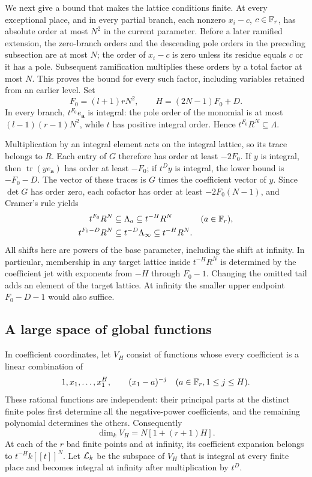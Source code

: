 We next give a bound that makes the lattice conditions finite.
At every exceptional place, and in every partial branch, each nonzero
$x_i-c$, $c\in\mathbb F_r$, has absolute order at most $N^2$ in the current
parameter.  Before a later ramified extension, the zero-branch orders
and the descending pole orders in the preceding subsection are at
most $N$; the order of $x_i-c$ is zero unless its residue equals $c$
or it has a pole.  Subsequent ramification multiplies these orders
by a total factor at most $N$.  This proves the bound for every such
factor, including variables retained from an earlier level.
Set
\begin{equation}\label{eq:pencil-FH}
 F_0=(l+1)rN^2,\qquad H=(2N-1)F_0+D.
\end{equation}
In every branch, $t^{F_0}e_{\boldsymbol a}$ is integral: the pole order
of the monomial is at most $(l-1)(r-1)N^2$, while $t$ has positive
integral order.  Hence $t^{F_0}R^N\subseteq\Lambda$.

Multiplication by an integral element acts on the integral lattice,
so its trace belongs to $R$.  Each entry of $G$ therefore has order at
least $-2F_0$.  If $y$ is integral, then
$\operatorname{tr}(y e_{\boldsymbol a})$ has order at least $-F_0$;
if $t^D y$ is integral, the lower bound is $-F_0-D$.
The vector of these traces is $G$ times the coefficient vector of $y$.
Since $\det G$ has order zero, each cofactor has order at least
$-2F_0(N-1)$, and Cramer's rule yields
\begin{equation}\label{eq:pencil-lattice-sandwich}
 \begin{aligned}
 t^{F_0}R^N&\subseteq\Lambda_a\subseteq t^{-H}R^N
       &&(a\in\mathbb F_r),\\
 t^{F_0-D}R^N&\subseteq t^{-D}\Lambda_\infty
                       \subseteq t^{-H}R^N.
 \end{aligned}
\end{equation}
All shifts here are powers of the base parameter, including the shift
at infinity.  In particular, membership in any target lattice inside
$t^{-H}R^N$ is determined by the coefficient jet with exponents from
$-H$ through $F_0-1$.  Changing the omitted tail adds an element of
the target lattice.  At infinity the smaller upper endpoint
$F_0-D-1$ would also suffice.

\subsection{A large space of global functions}

In coefficient coordinates, let $V_H$ consist of functions whose every
coefficient is a linear combination of
\[
 1,x_1,\ldots,x_1^H,
 \qquad (x_1-a)^{-j}\quad(a\in\mathbb F_r, 1\leq j\leq H).
\]
These rational functions are independent: their principal parts at
the distinct finite poles first determine all the negative-power
coefficients, and the remaining polynomial determines the others.
Consequently
\[
 \dim_k V_H=N[1+(r+1)H].
\]
At each of the $r$ bad finite points and at infinity, its coefficient
expansion belongs to $t^{-H}k[[t]]^N$.
Let $\mathcal L_k$ be the subspace of $V_H$ that is integral at every finite
place and becomes integral at infinity after multiplication by $t^D$.

